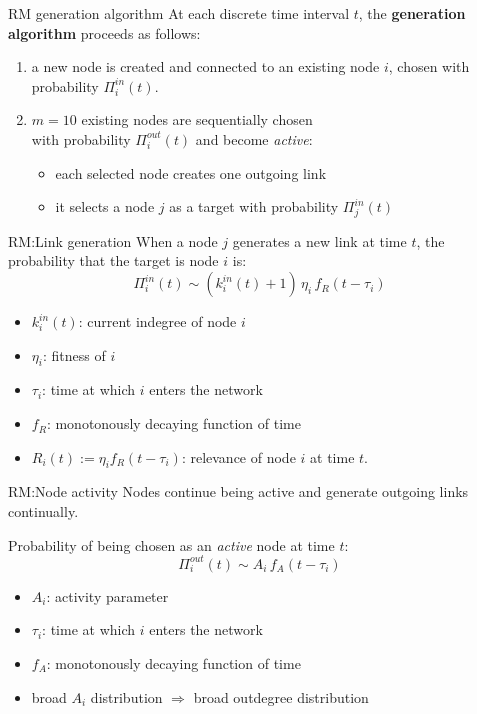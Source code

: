 \begin{frame}{RM generation algorithm}
    At each discrete time interval $t$, the \textbf{generation algorithm} proceeds as follows:
    \begin{enumerate}
        \item a new node is created and connected to an existing node $i$, chosen with probability $\Pi_i^{in}(t)$.
        \item $m=10$ existing nodes are sequentially chosen \\ with probability $\Pi_i^{out}(t)$ and become \emph{active}:
        \begin{itemize}
            \item each selected node creates one outgoing link
            \item it selects a node $j$ as a target with probability $\Pi_j^{in}(t)$
        \end{itemize}
    \end{enumerate}
\end{frame}

\begin{frame}{RM:\@ Link generation}
    When a node $j$ generates a new link at time $t$, the probability that the target is node $i$ is:
    \[
        \Pi_i^{in}(t) \sim (k_i^{in}(t) + 1) \, \eta_i \, f_R (t-\tau_i)
    \]
    \begin{itemize}
        \item $k_i^{in}(t)$: current indegree of node $i$
        \item $\eta_i$: fitness of $i$
        \item $\tau_i$: time at which $i$ enters the network
        \item $f_R$: monotonously decaying function of time
        \item $R_i(t) := \eta_i f_R (t-\tau_i)$: \alert{relevance} of node $i$ at time $t$.
    \end{itemize}
\end{frame}

\begin{frame}{RM:\@ Node activity}
    Nodes continue being active and generate outgoing links continually.

    Probability of being chosen as an \emph{active} node at time $t$:
    \[
        \Pi_i^{out}(t) \sim A_i \, f_A (t-\tau_i)
    \]
    \begin{itemize}
        \item $A_i$: activity parameter
        \item $\tau_i$: time at which $i$ enters the network
        \item $f_A$: monotonously decaying function of time
        \item broad $A_i$ distribution $\Longrightarrow$ broad outdegree distribution
    \end{itemize}
\end{frame}

